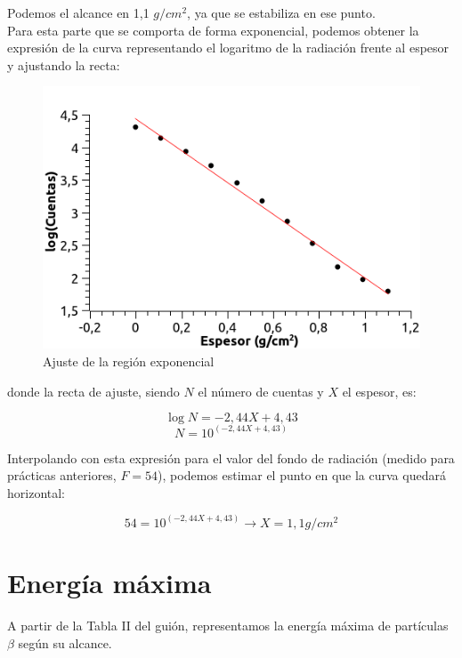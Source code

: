 \documentclass[a4paper,12pt,spanish]{article}
\begin{document}
	
	
	Podemos el alcance en 1,1 $\si{g/cm^2}$, ya que se estabiliza en ese punto. \\
	
	
	Para esta parte que se comporta de forma exponencial, podemos obtener la expresión de la curva representando el logaritmo de la radiación frente al espesor y ajustando la recta:
	
	\begin{figure}[H]
		\centering
		\includegraphics[width=0.7\linewidth]{imagenes/grafica_log_10}
		\caption{Ajuste de la región exponencial}
		\label{fig:graficalog10}
	\end{figure}
	
	
	donde la recta de ajuste, siendo $N$ el número de cuentas y $X$ el espesor, es:
	
	\[\log N = -2,44 X + 4,43\]
	\[N = 10^{(-2,44 X + 4,43)}\]
	
	
	
	Interpolando con esta expresión para el valor del fondo de radiación (medido para prácticas anteriores, $F = 54$), podemos estimar el punto en que la curva quedará horizontal:
	
	\[ 54 = 10^{(-2,44 X + 4,43)} \longrightarrow X = 1,1 \si{g/cm^2}
	\]
	
	\section{Energía máxima}
	
	
	A partir de la Tabla II del guión, representamos la energía máxima de partículas $\beta$ según su alcance.
		
\end{document}
